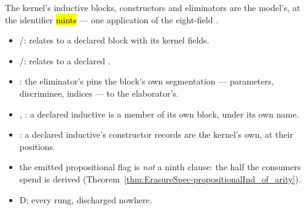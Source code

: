 \begin{assumption}
\label{asm:ErasureSpec-block_adequate}
\leanok
{}
\stAssumed{}  The kernel's inductive blocks, constructors and eliminators are the
model's, at the identifier \hl{ mints} --- one application of the
eight-field .
\begin{itemize}
\item {}/:  relates to a declared block with its kernel fields.
\item {}/:  relates to a declared .
\item {}: the eliminator's  pins the block's own segmentation
--- parameters, discriminee, indices --- to the elaborator's.
\item {}, : a declared inductive is a member of its own block, under
its own name.
\item {}: a declared inductive's constructor records are the kernel's own, at their
positions.
\item {} the emitted propositional flag is \emph{not} a ninth clause: the half the
consumers spend is derived (Theorem~\ref{thm:ErasureSpec-propositionalInd_of_arity}).
\item {} D;  every rung, discharged nowhere.
\end{itemize}
\end{assumption}

